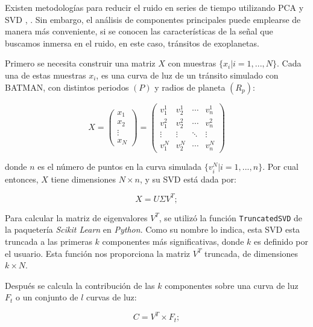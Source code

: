 Existen metodologías para reducir el ruido en series de tiempo utilizando PCA y SVD \cite{shin1999iterative}, \cite{bailey2012principal}. Sin embargo, el análisis de componentes principales puede emplearse de manera más conveniente, si se conocen las características de la señal que buscamos inmersa en el ruido, en este caso, tránsitos de exoplanetas.

Primero se necesita construir una matriz $X$ con muestras $\{x_{i}|i=1,...,N\}$. Cada una de estas muestras $x_{i}$, es una curva de luz de un tránsito simulado con BATMAN, con distintos periodos $(P)$ y radios de planeta $(R_{p})$:

\begin{equation}
  X = 
  \begin{pmatrix}
  x_{1} \\
  x_{2}\\
  \vdots  \\
  x_{N}
  \end{pmatrix}=
  \begin{pmatrix}
    v^{1}_{1} & v^{1}_{2} & \cdots & v^{1}_{n} \\
    v^{2}_{1} & v^{2}_{2} & \cdots & v^{2}_{n} \\
    \vdots  & \vdots  & \ddots & \vdots  \\
    v^{N}_{1} & v^{N}_{2} & \cdots & v^{N}_{n} 
  \end{pmatrix}
\end{equation}

donde $n$ es el número de puntos en la curva simulada $\{v^{N}_{i}|i=1,...,n\}$. Por cual entonces, $X$ tiene dimensiones $N\times n$, y su SVD está dada por:

\begin{equation}
  X=U\Sigma V^{T};
\end{equation}

Para calcular la matriz de eigenvalores $V^{T}$, se utilizó la función \texttt{TruncatedSVD} de la paquetería \textit{Scikit Learn} en \textit{Python}. Como su nombre lo indica, esta SVD esta truncada a las primeras $k$ componentes más significativas, donde $k$  es definido por el usuario. Esta función nos proporciona la matriz $V^{T}$ truncada, de dimensiones $k\times N$.

Después se calcula la contribución de las $k$ componentes sobre una curva de luz $F_{t}$ o un conjunto de $l$ curvas de luz:

\begin{equation}
  C=V^{T} \times F_{t};
\end{equation}

